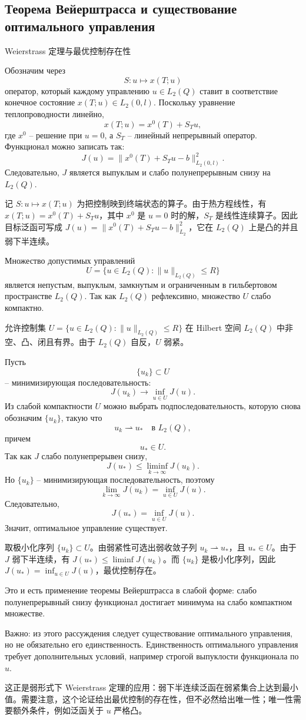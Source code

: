 \documentclass[12pt,a4paper]{article}
\newcommand{\zh}[1]{\par\noindent #1\par}
\begin{document}
\subsection*{Теорема Вейерштрасса и существование оптимального управления}
\zh{Weierstrass 定理与最优控制存在性}
Обозначим через
\[
S:u\mapsto x(T;u)
\]
оператор, который каждому управлению \(u\in L_2(Q)\) ставит в соответствие конечное состояние \(x(T;u)\in L_2(0,l)\). Поскольку уравнение теплопроводности линейно,
\[
x(T;u)=x^0(T)+S_Tu,
\]
где \(x^0\) -- решение при \(u=0\), а \(S_T\) -- линейный непрерывный оператор. Функционал можно записать так:
\[
J(u)=\|x^0(T)+S_Tu-b\|_{L_2(0,l)}^2.
\]
Следовательно, \(J\) является выпуклым и слабо полунепрерывным снизу на \(L_2(Q)\).
\zh{记 \(S:u\mapsto x(T;u)\) 为把控制映到终端状态的算子。由于热方程线性，有 \(x(T;u)=x^0(T)+S_Tu\)，其中 \(x^0\) 是 \(u=0\) 时的解，\(S_T\) 是线性连续算子。因此目标泛函可写成 \(J(u)=\|x^0(T)+S_Tu-b\|_{L_2}^2\)，它在 \(L_2(Q)\) 上是凸的并且弱下半连续。}


Множество допустимых управлений
\[
U=\{u\in L_2(Q):\|u\|_{L_2(Q)}\le R\}
\]
является непустым, выпуклым, замкнутым и ограниченным в гильбертовом пространстве \(L_2(Q)\). Так как \(L_2(Q)\) рефлексивно, множество \(U\) слабо компактно.
\zh{允许控制集 \(U=\{u\in L_2(Q):\|u\|_{L_2(Q)}\le R\}\) 在 Hilbert 空间 \(L_2(Q)\) 中非空、凸、闭且有界。由于 \(L_2(Q)\) 自反，\(U\) 弱紧。}

Пусть
\[
\{u_k\}\subset U
\]
-- минимизирующая последовательность:
\[
J(u_k)\to \inf_{u\in U}J(u).
\]
Из слабой компактности \(U\) можно выбрать подпоследовательность, которую снова обозначим \(\{u_k\}\), такую что
\[
u_k\rightharpoonup u_*
\quad \text{в }L_2(Q),
\]
причем
\[
u_*\in U.
\]
Так как \(J\) слабо полунепрерывен снизу,
\[
J(u_*)\le \liminf_{k\to\infty}J(u_k).
\]
Но \(\{u_k\}\) -- минимизирующая последовательность, поэтому
\[
\lim_{k\to\infty}J(u_k)=\inf_{u\in U}J(u).
\]
Следовательно,
\[
J(u_*)=\inf_{u\in U}J(u).
\]
Значит, оптимальное управление существует.
\zh{取极小化序列 \(\{u_k\}\subset U\)。由弱紧性可选出弱收敛子列 \(u_k\rightharpoonup u_*\)，且 \(u_*\in U\)。由于 \(J\) 弱下半连续，有 \(J(u_*)\le\liminf J(u_k)\)。而 \(\{u_k\}\) 是极小化序列，因此 \(J(u_*)=\inf_{u\in U}J(u)\)，最优控制存在。}

Это и есть применение теоремы Вейерштрасса в слабой форме: слабо полунепрерывный снизу функционал достигает минимума на слабо компактном множестве.

Важно: из этого рассуждения следует существование оптимального управления, но не обязательно его единственность. Единственность оптимального управления требует дополнительных условий, например строгой выпуклости функционала по \(u\).
\zh{这正是弱形式下 Weierstrass 定理的应用：弱下半连续泛函在弱紧集合上达到最小值。需要注意，这个论证给出最优控制的存在性，但不必然给出唯一性；唯一性需要额外条件，例如泛函关于 \(u\) 严格凸。}
\end{document}

